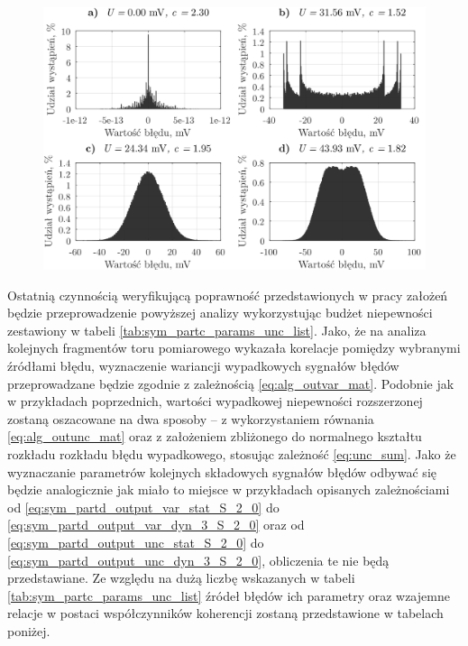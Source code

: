 \begin{figure}[htb!]
\begin{center}
\includegraphics{obrazki/hist_part_T}
\end{center}
\end{figure}

Ostatnią czynnością weryfikującą poprawność przedstawionych w pracy założeń będzie przeprowadzenie powyższej analizy wykorzystując budżet niepewności zestawiony w tabeli \ref{tab:sym_partc_params_unc_list}. Jako, że na analiza kolejnych fragmentów toru pomiarowego wykazała korelacje pomiędzy wybranymi źródłami błędu, wyznaczenie wariancji wypadkowych sygnałów błędów przeprowadzane będzie zgodnie z zależnością \eqref{eq:alg_outvar_mat}. Podobnie jak w przykładach poprzednich, wartości wypadkowej niepewności rozszerzonej zostaną oszacowane na dwa sposoby -- z wykorzystaniem równania \eqref{eq:alg_outunc_mat} oraz z założeniem zbliżonego do normalnego kształtu rozkładu rozkładu błędu wypadkowego, stosując zależność \eqref{eq:unc_sum}. Jako że wyznaczanie parametrów kolejnych składowych sygnałów błędów odbywać się będzie analogicznie jak miało to miejsce w przykładach opisanych zależnościami od \eqref{eq:sym_partd_output_var_stat_S_2_0} do \eqref{eq:sym_partd_output_var_dyn_3_S_2_0} oraz od \eqref{eq:sym_partd_output_unc_stat_S_2_0} do \eqref{eq:sym_partd_output_unc_dyn_3_S_2_0}, obliczenia te nie będą przedstawiane. Ze względu na dużą liczbę wskazanych w tabeli \ref{tab:sym_partc_params_unc_list} źródeł błędów ich parametry oraz wzajemne relacje w postaci współczynników koherencji zostaną przedstawione w tabelach poniżej.

